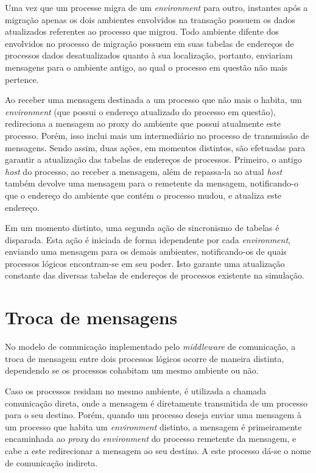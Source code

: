 Uma vez que um processe migra de um \textit{environment} para outro, instantes após a migração apenas os dois ambientes envolvidos na transação possuem os dados atualizados referentes ao processo que migrou. Todo ambiente difente dos envolvidos no processo de migração possuem em suas tabelas de endereços de processos dados desatualizados quanto à sua localização, portanto, enviariam mensagens para o ambiente antigo, ao qual o processo em questão não mais pertence.

Ao receber uma mensagem destinada a um processo que não mais o habita, um \textit{environment} (que possui o endereço atualizado do processo em questão), redireciona a mensagem ao proxy do ambiente que possui atualmente este processo. Porém, isso inclui mais um intermediário no processo de transmissão de mensagens. Sendo assim, duas ações, em momentos distintos, são efetuadas para garantir a atualização das tabelas de endereços de processos. Primeiro, o antigo \textit{host} do processo, ao receber a mensagem, além de repassa-la ao atual \textit{host} também devolve uma mensagem para o remetente da mensagem, notificando-o que o endereço do ambiente que contém o processo mudou, e atualiza este endereço.

Em um momento distinto, uma segunda ação de sincronismo de tabelas é disparada. Esta ação é iniciada de forma idependente por cada \textit{environment}, enviando uma mensagem para os demais ambientes, notificando-os de quais processos lógicos encontram-se em seu poder. Isto garante uma atualização constante das diversas tabelas de endereços de processos existente na simulação.

\section{Troca de mensagens \label{troca_mensagens}}

No modelo de comunicação implementado pelo \textit{middleware} de comunicação, a troca de mensagem entre dois processos lógicos ocorre de maneira distinta, dependendo se os processos cohabitam um mesmo ambiente ou não.

Caso os processos residam no mesmo ambiente, é utilizada a chamada comunicação direta, onde a mensagem é diretamente transmitida de um processo para o seu destino. Porém, quando um processo deseja enviar uma mensagem à um processo que habita um \textit{environment} distinto, a mensagem é primeiramente encaminhada ao \textit{proxy} do \textit{environment} do processo remetente da mensagem, e cabe a este redirecionar a mensagem ao seu destino. A este processo dá-se o nome de comunicação indireta.


